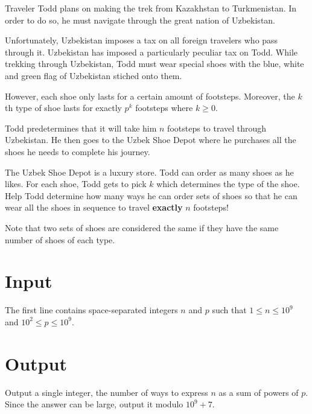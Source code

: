 
Traveler Todd plans on making the trek from Kazakhstan to Turkmenistan.
In order to do so, he must navigate through the great nation of Uzbekistan.

\medskip

Unfortunately, Uzbekistan imposes a tax on all foreign travelers who pass
through it. Uzbekistan has imposed a particularly peculiar tax on Todd.
While trekking through Uzbekistan, Todd must wear special shoes with the
blue, white and green flag of Uzbekistan stiched onto them.

\medskip

However, each shoe only lasts for a certain amount of footsteps. Moreover,
the $k$th type of shoe lasts for exactly $p^k$ footsteps where $k \ge 0$.

\medskip

Todd predetermines that it will take him $n$ footsteps to travel through
Uzbekistan. He then goes to the Uzbek Shoe Depot where he purchases all
the shoes he needs to complete his journey.

\medskip

The Uzbek Shoe Depot is a luxury store. Todd can order as many shoes as he
likes. For each shoe, Todd gets to pick $k$ which determines the type 
of the shoe. Help Todd determine how many ways he can order sets of shoes so
that he can wear all the shoes in sequence to travel \textbf{exactly} $n$
footsteps!

\medskip

Note that two sets of shoes are considered the same if they have the same
number of shoes of each type.

\section*{Input}
The first line contains space-separated integers $n$ and $p$ such that
$1 \leq n \leq 10^9$ and $10^2 \leq p \leq 10^9$.

\section*{Output}
Output a single integer, the number of ways to express $n$ as a sum of
powers of $p$. Since the answer can be large, output it modulo $10^9 + 7$.
